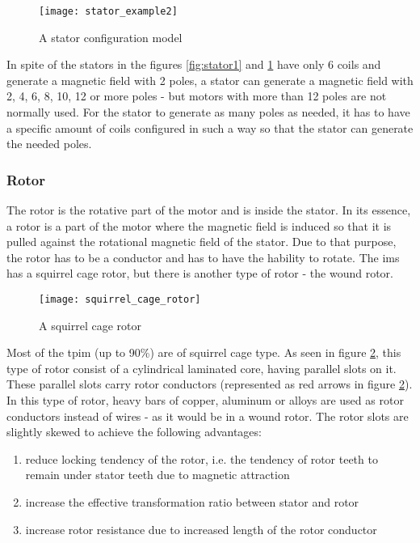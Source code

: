 \begin{figure}[htbp]
	\centering
	\texttt{[image: stator\_example2]}
	\caption{A stator configuration model}
	\label{fig:stator2}
\end{figure}

In spite of the stators in the figures \ref{fig:stator1} and \ref{fig:stator2} have only 6 coils and generate a magnetic field with 2 poles, a stator can generate a magnetic field with 2, 4, 6, 8, 10, 12 or more poles - but motors with more than 12 poles are not normally used. For the stator to generate as many poles as needed, it has to have a specific amount of coils configured in such a way so that the stator can generate the needed poles.


\subsubsection{Rotor}

The rotor is the rotative part of the motor and is inside the stator. In its essence, a rotor is a part of the motor where the magnetic field is induced so that it is pulled against the rotational magnetic field of the stator. Due to that purpose, the rotor has to be a conductor and has to have the hability to rotate.
The \acrshort{ims} has a squirrel cage rotor, but there is another type of rotor - the wound rotor. 

\begin{figure}[htbp]
	\centering
	\texttt{[image: squirrel\_cage\_rotor]}
	\caption{A squirrel cage rotor}
	\label{fig:squirrel_cage_rotor}
\end{figure}

Most of the \acrshort{tpim} (up to 90\%) are of squirrel cage type.
As seen in figure \ref{fig:squirrel_cage_rotor}, this type of rotor consist of a cylindrical laminated core, having parallel slots on it. These parallel slots carry rotor conductors (represented as red arrows in figure \ref{fig:squirrel_cage_rotor}). In this type of rotor, heavy bars of copper, aluminum or alloys are used as rotor conductors instead of wires - as it would be in a wound rotor. 
The rotor slots are slightly skewed to achieve the following advantages:
\begin{enumerate}
  \item reduce locking tendency of the rotor, i.e. the tendency of rotor teeth to remain under stator teeth due to magnetic attraction
  \item increase the effective transformation ratio between stator and rotor
  \item increase rotor resistance due to increased length of the rotor conductor 
\end{enumerate}


